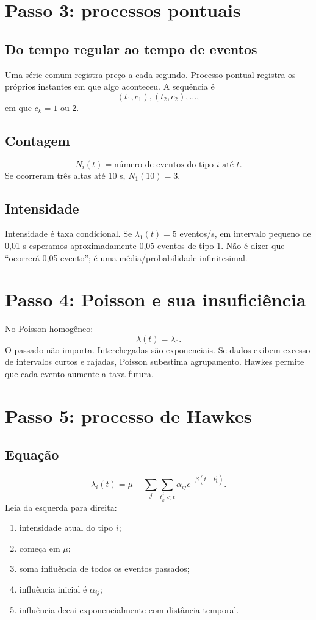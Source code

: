 \documentclass[12pt,a4paper,openany]{report}
\begin{document}
\chapter{Passo 3: processos pontuais}

\section{Do tempo regular ao tempo de eventos}

Uma série comum registra preço a cada segundo. Processo pontual registra os próprios
instantes em que algo aconteceu. A sequência é
\[
(t_1,c_1),(t_2,c_2),\ldots,
\]
em que \(c_k=1\) ou 2.

\section{Contagem}

\[
N_i(t)=\text{número de eventos do tipo }i\text{ até }t.
\]
Se ocorreram três altas até 10 s, \(N_1(10)=3\).

\section{Intensidade}

Intensidade é taxa condicional. Se \(\lambda_1(t)=5\) eventos/s, em intervalo pequeno
de 0,01 s esperamos aproximadamente 0,05 eventos de tipo 1. Não é dizer que ``ocorrerá
0,05 evento''; é uma média/probabilidade infinitesimal.

\chapter{Passo 4: Poisson e sua insuficiência}

No Poisson homogêneo:
\[
\lambda(t)=\lambda_0.
\]
O passado não importa. Interchegadas são exponenciais. Se dados exibem excesso de
intervalos curtos e rajadas, Poisson subestima agrupamento. Hawkes permite que cada
evento aumente a taxa futura.

\chapter{Passo 5: processo de Hawkes}

\section{Equação}

\[
\lambda_i(t)=\mu+\sum_j\sum_{t_k^j<t}\alpha_{ij}e^{-\beta(t-t_k^j)}.
\]
Leia da esquerda para direita:
\begin{enumerate}
  \item intensidade atual do tipo \(i\);
  \item começa em \(\mu\);
  \item soma influência de todos os eventos passados;
  \item influência inicial é \(\alpha_{ij}\);
  \item influência decai exponencialmente com distância temporal.
\end{enumerate}
\end{document}
